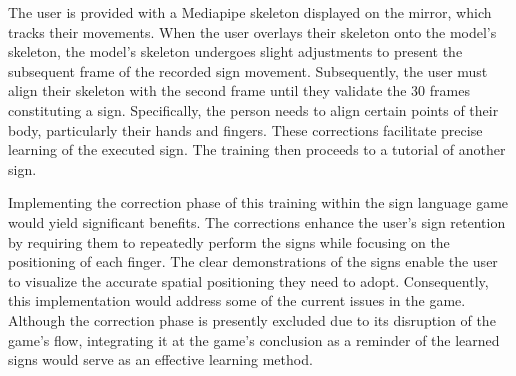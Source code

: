 The user is provided with a Mediapipe skeleton displayed on the mirror, which tracks their movements. When the user overlays their skeleton onto the model's skeleton, the model's skeleton undergoes slight adjustments to present the subsequent frame of the recorded sign movement. Subsequently, the user must align their skeleton with the second frame until they validate the 30 frames constituting a sign. Specifically, the person needs to align certain points of their body, particularly their hands and fingers. These corrections facilitate precise learning of the executed sign. The training then proceeds to a tutorial of another sign.

Implementing the correction phase of this training within the sign language game would yield significant benefits. The corrections enhance the user's sign retention by requiring them to repeatedly perform the signs while focusing on the positioning of each finger. The clear demonstrations of the signs enable the user to visualize the accurate spatial positioning they need to adopt. Consequently, this implementation would address some of the current issues in the game. Although the correction phase is presently excluded due to its disruption of the game's flow, integrating it at the game's conclusion as a reminder of the learned signs would serve as an effective learning method.